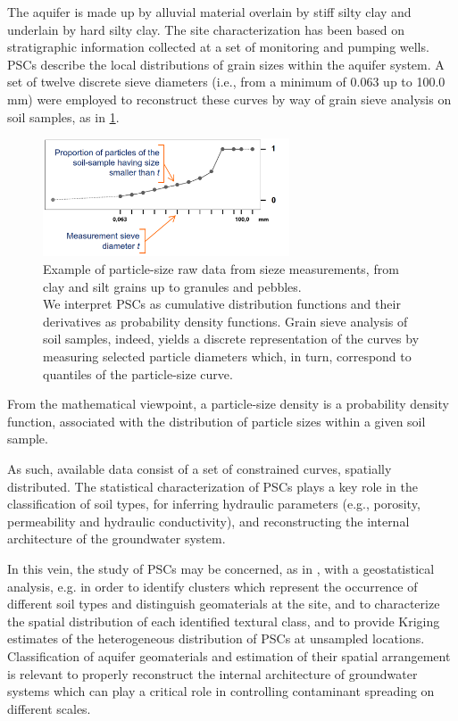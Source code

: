 The aquifer is made up by alluvial material overlain by stiff silty clay and underlain by hard silty clay. The site characterization has been based on stratigraphic information
collected at a set of monitoring and pumping wells.  \\
PSCs describe the local distributions of grain sizes within the aquifer system.
A set of twelve discrete sieve diameters (i.e., from a minimum of 0.063 up to 100.0 mm) were employed to reconstruct these curves by way of grain sieve analysis on soil samples, as in \ref{fig:sieve}.  

\begin{figure}
	\includegraphics[height=3.5cm]{./pictures/psc/psc.png}
	\centering
	\caption{Example of particle-size raw data from sieze measurements, from clay and silt grains up to granules and pebbles.  \\
	We interpret PSCs as cumulative distribution functions and their derivatives as probability density functions. 
	Grain sieve analysis of soil samples, indeed, yields a discrete representation of the curves by measuring selected particle diameters which, in turn, correspond to quantiles of the particle-size curve.}
	\label{fig:sieve}	
\end{figure}

From the mathematical viewpoint, a particle-size density is a probability density function, associated with the distribution of particle sizes within a given soil sample. 

As such, available data consist of a set of constrained curves, spatially distributed. The statistical characterization of PSCs plays a key role in the classification of soil types, for inferring hydraulic parameters (e.g., porosity, permeability and hydraulic conductivity), and reconstructing the internal architecture of the groundwater system. 

In this vein, the study of PSCs may be concerned, as in \citep{menafoglio:psc}, with a geostatistical analysis, e.g. in order to identify clusters which represent the occurrence of different soil types and distinguish geomaterials at the site, and to characterize the spatial distribution of each identified textural class, and to provide Kriging estimates of the heterogeneous distribution of PSCs at unsampled locations. \\
Classification of aquifer geomaterials and estimation of their spatial arrangement is relevant to properly reconstruct the internal architecture of groundwater systems which can play a critical role in controlling contaminant spreading on different scales. 


